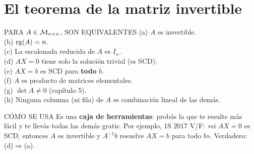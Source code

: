 \section{El teorema de la matriz invertible}
\begin{sello}{PARA $A\in\mathcal{M}_{n\times n}$, SON EQUIVALENTES}
(a) $A$ es invertible. \\
(b) $\operatorname{rg}(A)=n$.\\
(c) La escalonada reducida de $A$ es $I_n$.\\
(d) $AX=0$ tiene solo la solución trivial (es SCD).\\
(e) $AX=b$ es SCD para \textbf{todo} $b$.\\
(f) $A$ es producto de matrices elementales.\\
(g) $\det A\neq0$ (capítulo 5).\\
(h) Ninguna columna (ni fila) de $A$ es combinación lineal de las demás.
\end{sello}
\begin{tip}{CÓMO SE USA}
Es una \textbf{caja de herramientas}: probás la que te resulte más fácil y te llevás todas las demás gratis. Por ejemplo, 1S 2017 V/F: «si $AX=0$ es SCD, entonces $A$ es invertible y $A^{-1}b$ resuelve $AX=b$ para todo $b$». Verdadero: (d)$\Rightarrow$(a).
\end{tip}
